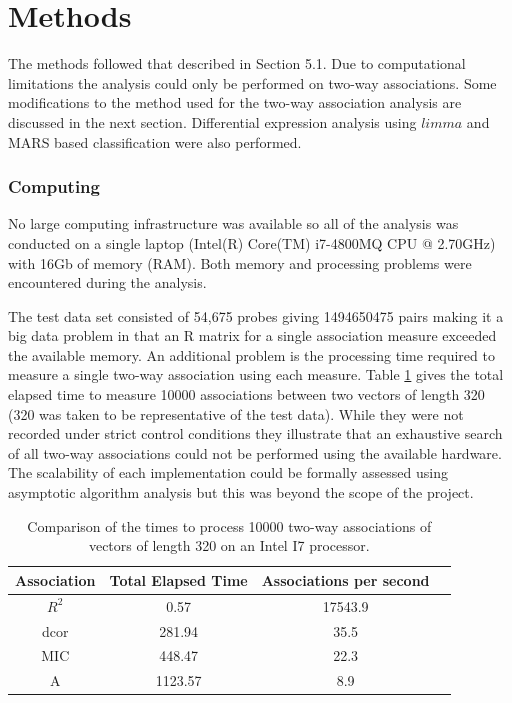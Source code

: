 \documentclass[a4paper, 12pt]{report}
\begin{document}
\section{Methods}
The methods followed that described in Section 5.1. Due to computational limitations the analysis could only be performed on two-way associations. Some modifications to the method used for the two-way association analysis are discussed in the next section.  Differential expression analysis using $limma$ and MARS based classification were also performed.

\subsubsection{Computing}
No large computing infrastructure was available so all of the analysis was conducted on a single laptop (Intel(R) Core(TM) i7-4800MQ CPU @ 2.70GHz) with 16Gb of memory (RAM). Both memory and processing problems were encountered during the analysis.

The test data set consisted of 54,675 probes giving 1494650475 pairs making it a big data problem in that an R matrix for a single association measure exceeded the available memory. %
An additional problem is the processing time required to measure a single two-way association using each measure. Table \ref{T:times} gives the total elapsed time to measure 10000 associations between two vectors of length 320 (320 was taken to be representative of the test data). While they were not recorded under strict control conditions they illustrate that an exhaustive search of all two-way associations could not be performed using the available hardware. The scalability of each implementation could be formally assessed using asymptotic algorithm analysis \cite{knuth} but this was beyond the scope of the project.

\begin{table}[H]
\begin{centering}
\begin{tabular}{cccc}
  \hline
Association & Total Elapsed Time & Associations per second \\ 
  \hline
$R^2$ & 0.57  & 17543.9 \\ 
dcor & 281.94  & 35.5   \\ 
MIC & 448.47  & 22.3   \\ 
A & 1123.57  & 8.9   \\ 
   \hline
\end{tabular}
\caption{Comparison of the times to process 10000 two-way associations of vectors of length 320 on an Intel I7 processor.} 
\label{T:times}
\end{centering}
\end{table}
\end{document}
